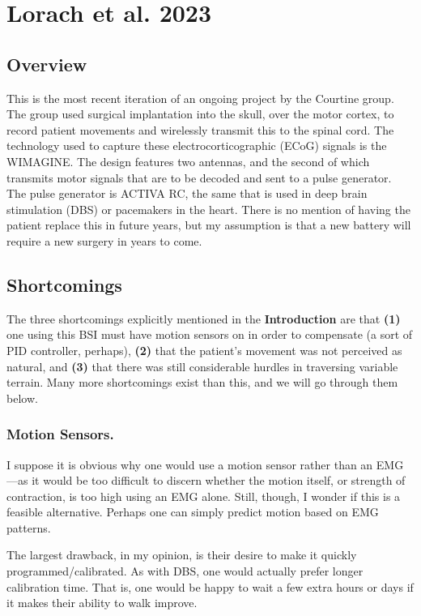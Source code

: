 \documentclass[12pt]{report}
\begin{document}
\section{Lorach et al. 2023} 
\subsection{Overview} This is the most recent iteration of an ongoing project by the Courtine group. The group used surgical implantation into the skull, over the motor cortex, to record patient movements and wirelessly transmit this to the spinal cord. The technology used to capture these electrocorticographic (ECoG) signals is the WIMAGINE. The design features two antennas, and the second of which transmits motor signals that are to be decoded and sent to a pulse generator. The pulse generator is ACTIVA RC, the same that is used in deep brain stimulation (DBS) or pacemakers in the heart. There is no mention of having the patient replace this in future years, but my assumption is that a new battery will require a new surgery in years to come. 


\subsection{Shortcomings} The three shortcomings explicitly mentioned in the \textbf{Introduction} are that \textbf{(1)} one using this BSI must have motion sensors on in order to compensate (a sort of PID controller, perhaps),  \textbf{(2)} that the patient's movement was not perceived as natural, and \textbf{(3)} that there was still considerable hurdles in traversing variable terrain. Many more shortcomings exist than this, and we will go through them below.

\subsubsection{Motion Sensors.} I suppose it is obvious why one would use a motion sensor rather than an EMG---as it would be too difficult to discern whether the motion itself, or strength of contraction, is too high using an EMG alone. Still, though, I wonder if this is a feasible alternative. Perhaps one can simply predict motion based on EMG patterns.\newline

The largest drawback, in my opinion, is their desire to make it quickly programmed/calibrated. As with DBS, one would actually prefer longer calibration time. That is, one would be happy to wait a few extra hours or days if it makes their ability to walk improve.\newline
\end{document}
